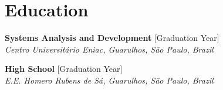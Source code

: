 \documentclass[11pt,letterpaper]{article}
\begin{document}
\section{Education}
\textbf{Systems Analysis and Development} \hfill [Graduation Year] \\
\textit{Centro Universitário Eniac, Guarulhos, São Paulo, Brazil}

\textbf{High School} \hfill [Graduation Year] \\
\textit{E.E. Homero Rubens de Sá, Guarulhos, São Paulo, Brazil}
\end{document}

